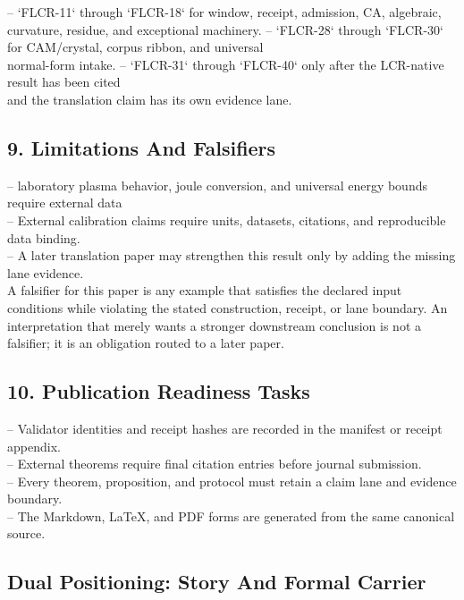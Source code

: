 \documentclass[11pt]{article}
\begin{document}
\noindent{}-- `FLCR-11` through `FLCR-18` for window, receipt, admission, CA, algebraic,\\
  curvature, residue, and exceptional machinery.
\noindent{}-- `FLCR-28` through `FLCR-30` for CAM/crystal, corpus ribbon, and universal\\
  normal-form intake.
\noindent{}-- `FLCR-31` through `FLCR-40` only after the LCR-native result has been cited\\
  and the translation claim has its own evidence lane.

\subsection*{9. Limitations And Falsifiers}

\noindent{}-- laboratory plasma behavior, joule conversion, and universal energy bounds require external data\\
\noindent{}-- External calibration claims require units, datasets, citations, and reproducible data binding.\\
\noindent{}-- A later translation paper may strengthen this result only by adding the missing lane evidence.\\

A falsifier for this paper is any example that satisfies the declared input
conditions while violating the stated construction, receipt, or lane boundary.
An interpretation that merely wants a stronger downstream conclusion is not a
falsifier; it is an obligation routed to a later paper.

\subsection*{10. Publication Readiness Tasks}

\noindent{}-- Validator identities and receipt hashes are recorded in the manifest or receipt appendix.\\
\noindent{}-- External theorems require final citation entries before journal submission.\\
\noindent{}-- Every theorem, proposition, and protocol must retain a claim lane and evidence boundary.\\
\noindent{}-- The Markdown, LaTeX, and PDF forms are generated from the same canonical source.\\

\subsection*{Dual Positioning: Story And Formal Carrier}
\end{document}
